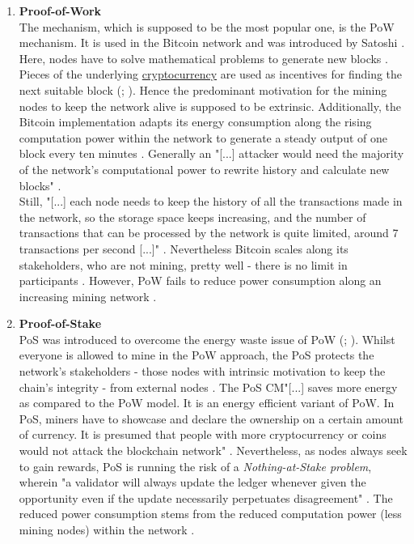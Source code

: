 \begin{enumerate}
	\item \textbf{Proof-of-Work} \label{sec:PoW} \\
	The mechanism, which is supposed to be the most popular one, is the \gls{PoW} mechanism.
	It is used in the Bitcoin network and was introduced by Satoshi \citet{Nakamoto.2009}.
	Here, nodes have to solve mathematical problems to generate new blocks \cite[4]{Butijn.2020}.
	Pieces of the underlying \hyperref[sec:def_Cryptocurrency]{cryptocurrency} are used as
	incentives for finding the next suitable block (\citet[8]{Nakamoto.2009}; \citet[2]{Catalini.2016}).
	Hence the predominant motivation for the mining nodes to keep the network alive is supposed to be extrinsic.
	Additionally, the Bitcoin implementation adapts its energy consumption along the rising computation power
	within the network to generate a steady output of one block every ten minutes \cite[2254]{Ma.2020}.
	Generally an "[...] attacker would need the majority of the network’s computational power to rewrite history and calculate new blocks" \cite[3-4]{Demi.2021}. \\
	Still, "[...] each node needs to keep the history of all the transactions made in the network, so the storage space keeps increasing,
	and the number of transactions that can be processed by the network is quite limited, around 7 transactions per second [...]" \cite[81]{Besancon.2019}.
	Nevertheless Bitcoin scales along its stakeholders, who are not mining, pretty well - there is no limit in participants \cite[8]{Nakamoto.2009}.
	However, \gls{PoW} fails to reduce power consumption along an increasing mining network \cite[1-2]{Saleh.2020}.
	
	\item \textbf{Proof-of-Stake} \label{sec:DefPoS} \\
	\gls{PoS} was introduced to overcome the energy waste issue of \gls{PoW} (\citet[56]{Chaudhry.2018}; \citet{Narayanan.2018}).
	Whilst everyone is allowed to mine in the \gls{PoW} approach, the \gls{PoS} protects the network's
	stakeholders - those nodes with intrinsic motivation to keep the chain's integrity - from external nodes \cite[56]{Chaudhry.2018}.
	The \gls{PoS} \gls{CM}"[...] saves more energy as compared to the \gls{PoW} model.
	It is an energy efficient variant of \gls{PoW}.
	In \gls{PoS}, miners have to showcase and declare the ownership on a certain amount of currency.
	It is presumed that people with more cryptocurrency or coins would not attack the blockchain network" \cite[3]{Khan.2020}.
	Nevertheless, as nodes always seek to gain rewards, \gls{PoS} is running the risk of a \textit{Nothing-at-Stake problem},
	wherein "a validator will always update the ledger whenever given the opportunity even if the update necessarily perpetuates disagreement" \cite[2]{Saleh.2020}.
	The reduced power consumption stems from the reduced computation power (less mining nodes) within the network \cite[56]{Chaudhry.2018}.
	

\end{enumerate}
